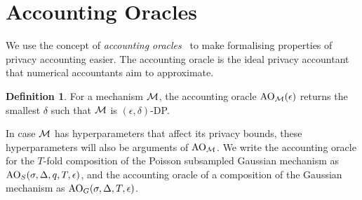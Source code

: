 \documentclass{article}
\theoremstyle{plain}
\theoremstyle{definition}
\newtheorem{definition}[theorem]{Definition}
\theoremstyle{remark}
\begin{document}
\section{Accounting Oracles}\label{sec:accounting-oracles}

We use the concept of \emph{accounting oracles}~\citep{tajeddinePrivacypreservingDataSharing2020}
to make formalising properties of privacy accounting easier. The accounting oracle 
is the ideal privacy accountant that numerical accountants aim to approximate.

\begin{definition}
    For a mechanism $\mathcal{M}$, the accounting oracle $\mathrm{AO}_{\mathcal{M}}(\epsilon)$
    returns the smallest $\delta$ such that $\mathcal{M}$ is $(\epsilon, \delta)$-DP.
\end{definition}
In case $\mathcal{M}$ has hyperparameters that affect its privacy bounds, these 
hyperparameters will also be arguments of $\mathrm{AO}_{\mathcal{M}}$.
We write the accounting oracle for the $T$-fold composition of the Poisson subsampled 
Gaussian mechanism as 
$\mathrm{AO}_S(\sigma, \Delta, q, T, \epsilon)$, and the accounting oracle of a composition of 
the Gaussian mechanism as $\mathrm{AO}_G(\sigma, \Delta, T, \epsilon)$.
\end{document}
